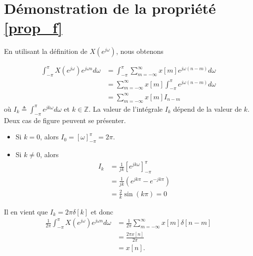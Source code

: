 \documentclass[11pt,a4paper]{IEEEtran}
\begin{document}
\section{Démonstration de la propriété \ref{prop_f}}
\label{dprop_f}
En utilisant la définition de $X(e^{j\omega})$, nous obtenons

\begin{align*}
\int_{-\pi}^{\pi} X(e^{j\omega})e^{j\omega n}d\omega&=\int_{-\pi}^{\pi} \sum_{m=-\infty}^{\infty}x[m]e^{j\omega (n-m)}d\omega\\
&= \sum_{m=-\infty}^{\infty}x[m]\int_{-\pi}^{\pi}e^{j\omega (n-m)}d\omega\\
&= \sum_{m=-\infty}^{\infty}x[m]I_{n-m}
\end{align*}
où $I_{k}\triangleq \int_{-\pi}^{\pi}e^{jk\omega }d\omega$ et $k\in \mathbb{Z}$. La valeur de l'intégrale $I_{k}$ dépend de la valeur de $k$. Deux cas de figure peuvent se présenter.
\begin{itemize}
\item Si $k=0$, alors $I_{0}=[\omega]_{-\pi}^{\pi}=2\pi$.
\item Si $k\ne 0$, alors 
\begin{align*}
I_{k}&=\frac{1}{jk}[e^{jk\omega }]_{-\pi}^{\pi}\\
&=\frac{1}{jk}(e^{jk\pi}-e^{-jk\pi})\\
&=\frac{2}{k}\sin(k\pi)=0
\end{align*}
\end{itemize}
Il en vient que $I_{k}=2\pi\delta[k]$ et donc
\begin{align*}
\frac{1}{2\pi}\int_{-\pi}^{\pi} X(e^{j\omega})e^{j\omega n}d\omega&=\frac{1}{2\pi} \sum_{m=-\infty}^{\infty}x[m]\delta[n-m]\\
&=\frac{2\pi x[n]}{2\pi}\\
&=x[n].
\end{align*}
\end{document}
